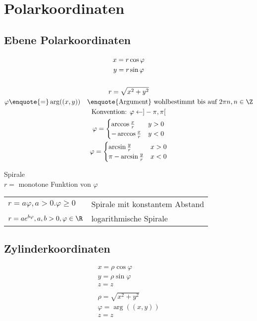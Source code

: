 \section{Polarkoordinaten}
\subsection{Ebene Polarkoordinaten}
\begin{gather*}
	x = r \cos \varphi \\
	y = r \sin \varphi \\
	\\
	r = \sqrt{x^2 + y^2} \\
	\varphi \enquote{=} \arg((x,y)) \quad \text{\enquote{Argument} wohlbestimmt bis auf $2\pi n , n \in \Z$} \\
	\text{Konvention: } \varphi \leftarrow ] -\pi , \pi [ \\
	\varphi = \begin{cases}
		\arccos \frac{x}{r}	&y > 0	\\
		-\arccos \frac{x}{r}	&y < 0	
	\end{cases} \\
	\varphi = \begin{cases}
		\arcsin \frac{y}{r}	&x > 0	\\
		\pi -\arcsin \frac{y}{r}	&x < 0	
	\end{cases}
\end{gather*}

\begin{bsp*}
	Spirale \\
	$r =$ monotone Funktion von $\varphi$ \\
	\begin{tabular}{ll}
		$r = a \varphi , a > 0 . \varphi \geq 0$			&Spirale mit konstantem Abstand	\\
		$r = a e^{b\varphi} , a, b > 0 , \varphi \in \R$	&logarithmische Spirale		
	\end{tabular}
\end{bsp*}

\subsection{Zylinderkoordinaten}
\begin{gather*}
	x = \rho \cos \varphi \\
	y = \rho \sin \varphi \\
	z = z \\
	\\
	\rho = \sqrt{x^2 + y^2} \\
	\varphi = \arg((x,y)) \\
	z = z
\end{gather*}

